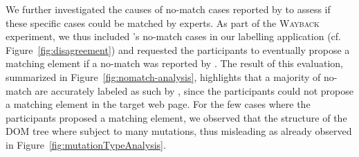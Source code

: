 \begin{table}[h]
    \caption{Confusion matrix on the \textsc{Wayback} dataset.}\label{tab:labels}
    \centering
\end{table}

We further investigated the causes of \textsf{no-match} cases reported by \erratum{} to assess if these specific cases could be matched by experts.
As part of the \textsc{Wayback} experiment, we thus included \erratum's \textsf{no-match} cases in our labelling application (cf. Figure~\ref{fig:disagreement}) and requested the participants to eventually propose a matching element if a \textsf{no-match} was reported by \erratum{}.
The result of this evaluation, summarized in Figure~\ref{fig:nomatch-analysis}, highlights that a majority of \textsf{no-match} are accurately labeled as such by \erratum{}, since the participants could not propose a matching element in the target web page. 
For the few cases where the participants proposed a matching element, we observed that the structure of the DOM tree where subject to many mutations, thus misleading \erratum{} as already observed in Figure~\ref{fig:mutationTypeAnalysis}.

